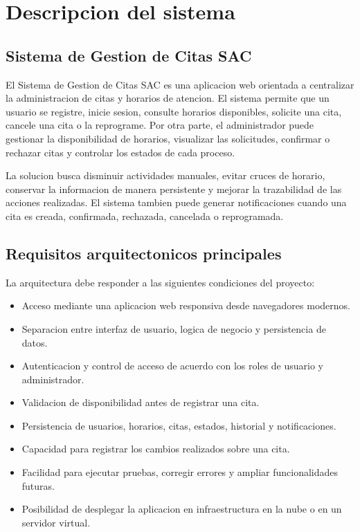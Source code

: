 \documentclass[12pt,letterpaper]{article}
\begin{document}
\section{Descripcion del sistema}

\subsection{Sistema de Gestion de Citas SAC}

El Sistema de Gestion de Citas SAC es una aplicacion web orientada a centralizar la administracion de citas y horarios de atencion. El sistema permite que un usuario se registre, inicie sesion, consulte horarios disponibles, solicite una cita, cancele una cita o la reprograme. Por otra parte, el administrador puede gestionar la disponibilidad de horarios, visualizar las solicitudes, confirmar o rechazar citas y controlar los estados de cada proceso.

La solucion busca disminuir actividades manuales, evitar cruces de horario, conservar la informacion de manera persistente y mejorar la trazabilidad de las acciones realizadas. El sistema tambien puede generar notificaciones cuando una cita es creada, confirmada, rechazada, cancelada o reprogramada.

\subsection{Requisitos arquitectonicos principales}

La arquitectura debe responder a las siguientes condiciones del proyecto:

\begin{itemize}[leftmargin=1.2cm]
    \item Acceso mediante una aplicacion web responsiva desde navegadores modernos.
    \item Separacion entre interfaz de usuario, logica de negocio y persistencia de datos.
    \item Autenticacion y control de acceso de acuerdo con los roles de usuario y administrador.
    \item Validacion de disponibilidad antes de registrar una cita.
    \item Persistencia de usuarios, horarios, citas, estados, historial y notificaciones.
    \item Capacidad para registrar los cambios realizados sobre una cita.
    \item Facilidad para ejecutar pruebas, corregir errores y ampliar funcionalidades futuras.
    \item Posibilidad de desplegar la aplicacion en infraestructura en la nube o en un servidor virtual.
\end{itemize}
\end{document}
